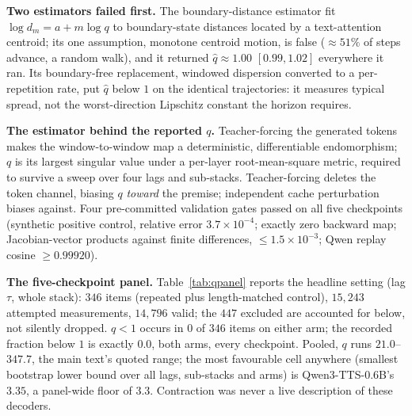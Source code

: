 \noindent\textbf{Two estimators failed first.} The boundary-distance
estimator fit $\log d_m = a + m\log q$ to boundary-state distances
located by a text-attention centroid; its one assumption, monotone
centroid motion, is false (${\approx}51\%$ of steps advance, a random
walk), and it returned $\hat q\approx1.00$ $[0.99,1.02]$ everywhere it
ran. Its boundary-free replacement, windowed dispersion converted to a
per-repetition rate, put $\hat q$ below $1$ on the identical
trajectories: it measures typical spread, not the worst-direction
Lipschitz constant the horizon requires.

\noindent\textbf{The estimator behind the reported $q$.}
Teacher-forcing the generated tokens makes the window-to-window map a
deterministic, differentiable endomorphism; $q$ is its largest singular
value under a per-layer root-mean-square metric, required to survive a
sweep over four lags and sub-stacks. Teacher-forcing deletes the token
channel, biasing $q$ \emph{toward} the premise; independent cache
perturbation biases against. Four pre-committed validation gates passed
on all five checkpoints (synthetic positive control, relative error
$3.7\times10^{-4}$; exactly zero backward map; Jacobian-vector products
against finite differences, ${\le}1.5\times10^{-3}$; Qwen replay
cosine ${\ge}0.99920$).

\noindent\textbf{The five-checkpoint panel.}
Table~\ref{tab:qpanel} reports the headline setting (lag $\tau$, whole
stack): $346$ items (repeated plus length-matched control), $15{,}243$
attempted measurements, $14{,}796$ valid; the $447$ excluded are accounted for
below, not silently dropped. $q < 1$ occurs in $0$ of
$346$ items on either arm; the recorded fraction below $1$ is exactly
$0.0$, both arms, every checkpoint. Pooled, $q$ runs $21.0$--$347.7$,
the main text's quoted range; the most favourable cell anywhere
(smallest bootstrap lower bound over all lags, sub-stacks and arms) is
Qwen3-TTS-0.6B's $3.35$, a panel-wide floor of $3.3$. Contraction was
never a live description of these decoders.

